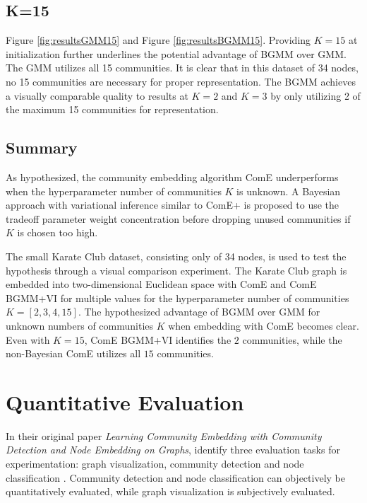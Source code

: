 \documentclass[conference]{IEEEtran}
\newcommand{\visresults}[2]{
    \begin{figure}[H]
        \centering
        \begin{subfigure}{.15\textwidth}
            \centering
            \texttt{[image: images/results/\#1/graph\_\#2.png]}
            \caption{Graph}
        \end{subfigure}%
        \begin{subfigure}{.15\textwidth}
            \centering
            \texttt{[image: images/results/\#1/embeddings\_\#2.png]}
            \caption{Embeddings}
        \end{subfigure}%
        \begin{subfigure}{.15\textwidth}
            \centering
            \texttt{[image: images/results/\#1/weights\_\#2.png]}
            \caption{Weights}
        \end{subfigure}%
        \caption{ComE with #1, $K=#2$}
        \label{fig:results#1#2}
    \end{figure}
}
\begin{document}
\subsection{K=15}


Figure \ref{fig:resultsGMM15} and Figure \ref{fig:resultsBGMM15}.
Providing $K=15$ at initialization further underlines the potential advantage of BGMM over GMM. The GMM utilizes all 15 communities. It is clear that in this dataset of 34 nodes, no 15 communities are necessary for proper representation. The BGMM achieves a visually comparable quality to results at $K=2$ and $K=3$ by only utilizing 2 of the maximum 15 communities for representation.

\subsection{Summary}

As hypothesized, the community embedding algorithm ComE underperforms when the hyperparameter number of communities $K$ is unknown. A Bayesian approach with variational inference similar to ComE+ is proposed to use the tradeoff parameter weight concentration before dropping unused communities if $K$ is chosen too high.

The small Karate Club dataset, consisting only of 34 nodes, is used to test the hypothesis through a visual comparison experiment. The Karate Club graph is embedded into two-dimensional Euclidean space with ComE and ComE BGMM+VI for multiple values for the hyperparameter number of communities $K = [2, 3, 4, 15]$. The hypothesized advantage of BGMM over GMM for unknown numbers of communities $K$ when embedding with ComE becomes clear. Even with $K=15$, ComE BGMM+VI identifies the $2$ communities, while the non-Bayesian ComE utilizes all $15$ communities.


\section{Quantitative Evaluation}
\label{ch:come_eval}

In their original \citeyear{ComE} paper \textit{Learning Community Embedding with Community Detection and Node Embedding on Graphs}, \citeauthor{ComE} identify three evaluation tasks for experimentation: graph visualization, community detection and node classification \cite{ComE}. Community detection and node classification can objectively be quantitatively evaluated, while graph visualization is subjectively evaluated.
\end{document}
